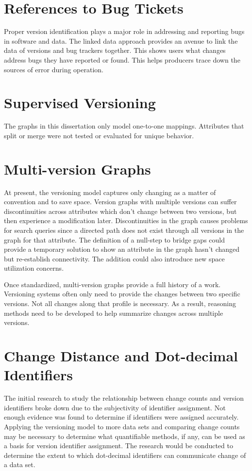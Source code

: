 \section{References to Bug Tickets}

Proper version identification plays a major role in addressing and reporting bugs in software and data.
The linked data approach provides an avenue to link the data of versions and bug trackers together.
This shows users what changes address bugs they have reported or found.
This helps producers trace down the sources of error during operation.

\section{Supervised Versioning}

The graphs in this dissertation only model one-to-one mappings.
Attributes that split or merge were not tested or evaluated for unique behavior.

\section{Multi-version Graphs}

At present, the versioning model captures only changing as a matter of convention and to save space.
Version graphs with multiple versions can suffer discontinuities across attributes which don't change between two versions, but then experience a modification later.
Discontinuities in the graph causes problems for search queries since a directed path does not exist through all versions in the graph for that attribute.
The definition of a null-step to bridge gaps could provide a temporary solution to show an attribute in the graph hasn't changed but re-establish connectivity.
The addition could also introduce new space utilization concerns.

Once standardized, multi-version graphs provide a full history of a work.
Versioning systems often only need to provide the changes between two specific versions.
Not all changes along that profile is necessary.
As a result, reasoning methods need to be developed to help summarize changes across multiple versions.

\section{Change Distance and Dot-decimal Identifiers}

The initial research to study the relationship between change counts and version identifiers broke down due to the subjectivity of identifier assignment.
Not enough evidence was found to determine if identifiers were assigned accurately.
Applying the versioning model to more data sets and comparing change counts may be necessary to determine what quantifiable methods, if any, can be used as a basis for version identifier assignment.
The research would be conducted to determine the extent to which dot-decimal identifiers can communicate change of a data set.

